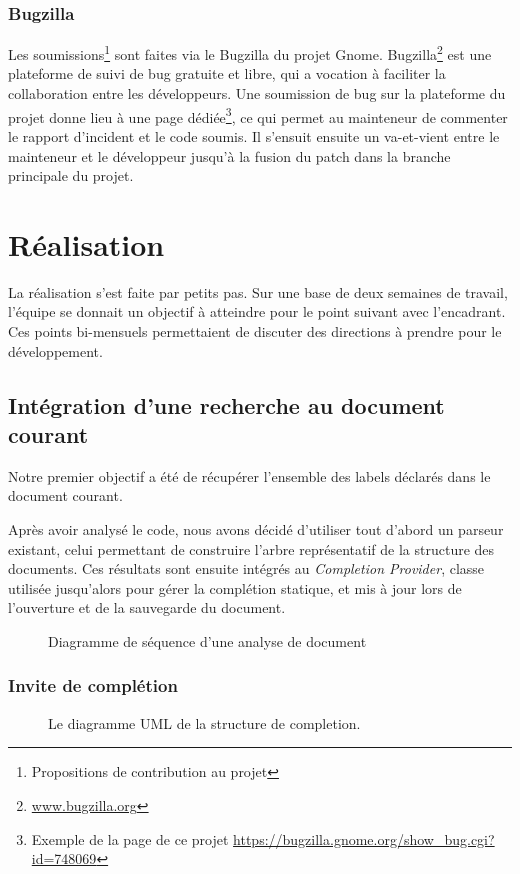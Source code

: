 \documentclass[a4paper,11pt]{report}
\begin{document}
\subsection{Bugzilla}
Les soumissions\footnote{Propositions de contribution au projet} sont faites via le Bugzilla du projet Gnome.
Bugzilla\footnote{\url{www.bugzilla.org}} est une plateforme de suivi de bug gratuite et libre, qui a vocation à faciliter la collaboration entre les développeurs.
Une soumission de bug sur la plateforme du projet donne lieu à une page dédiée\footnote{Exemple de la page de ce projet \url{https://bugzilla.gnome.org/show_bug.cgi?id=748069}}, ce qui permet au mainteneur de commenter le rapport d'incident et le code soumis.
Il s'ensuit ensuite un va-et-vient entre le mainteneur et le développeur jusqu'à la fusion du patch dans la branche principale du projet.

\chapter{Réalisation}
La réalisation s'est faite par petits pas. Sur une base de deux semaines de travail, l'équipe se donnait un objectif à atteindre pour le point suivant avec l'encadrant.
Ces points bi-mensuels permettaient de discuter des directions à prendre pour le développement.

\section{Intégration d'une recherche au document courant}
Notre premier objectif a été de récupérer l'ensemble des labels déclarés dans le document courant.

Après avoir analysé le code, nous avons décidé d'utiliser tout d'abord un parseur existant, celui permettant de construire l'arbre représentatif de la structure des documents.
Ces résultats sont ensuite intégrés au \textit{Completion Provider}, classe utilisée jusqu'alors pour gérer la complétion statique, et mis à jour lors de l'ouverture et de la sauvegarde du document.

\begin{figure}[h]
\label{fig:doc_opening}
\centering

\caption{Diagramme de séquence d'une analyse de document}
\end{figure}

\subsection{Invite de complétion}
\begin{figure}[h!]
\label{fig:uml_completion_structure}
\centering

\caption{Le diagramme UML de la structure de completion.}
\end{figure}
\end{document}
